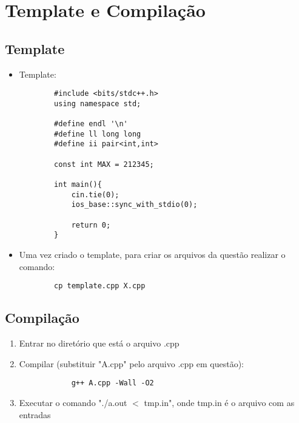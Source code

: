 \section{Template e Compilação}
\subsection{Template}
\begin{itemize}
    \item Template:
    \begin{verbatim}
        #include <bits/stdc++.h>
        using namespace std;

        #define endl '\n'
        #define ll long long
        #define ii pair<int,int>

        const int MAX = 212345;

        int main(){
            cin.tie(0);
            ios_base::sync_with_stdio(0);

            return 0;
        }
    \end{verbatim}
    \item Uma vez criado o template, para criar os arquivos da questão realizar o comando:
    \begin{verbatim}
        cp template.cpp X.cpp
    \end{verbatim}

\end{itemize}

\subsection{Compilação}
    \begin{enumerate}
        \item Entrar no diretório que está o arquivo .cpp
        \item Compilar (substituir "A.cpp" pelo arquivo .cpp em questão): 
        \begin{verbatim}
            g++ A.cpp -Wall -O2
        \end{verbatim}
        \item Executar o comando "./a.out $<$ tmp.in", onde tmp.in é o arquivo com as entradas\\
    \end{enumerate}
\pagebreak

